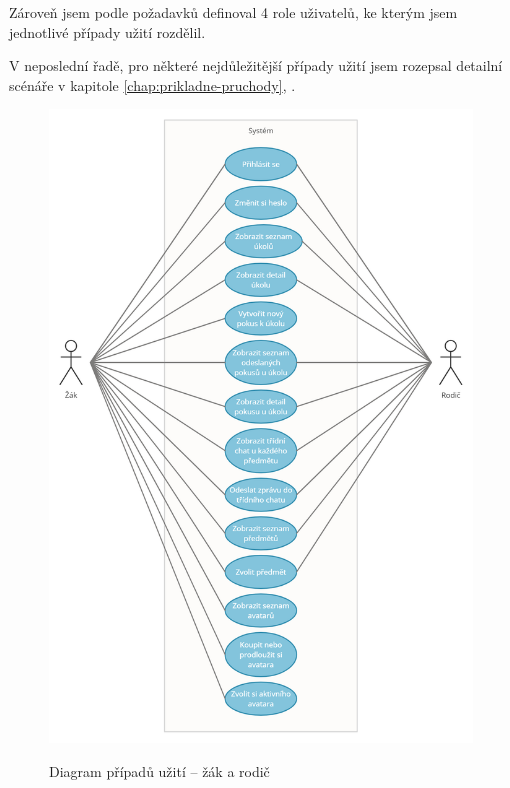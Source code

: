 \documentclass[twoside]{ctuthesis}
\theoremstyle{plain}
\theoremstyle{definition}
\theoremstyle{note}
\begin{document}
Zároveň jsem podle požadavků definoval 4 role uživatelů, ke kterým jsem jednotlivé případy užití rozdělil.

V neposlední řadě, pro některé nejdůležitější případy užití jsem rozepsal detailní scénáře v kapitole \ref{chap:prikladne-pruchody}, .


\begin{figure}
    \caption{Diagram případů užití -- žák a rodič}
    \centering
    \includegraphics[width=\textwidth]{images/zak_a_rodic}
    \label{img:usecase_zak_a_rodic}
\end{figure}
\end{document}
